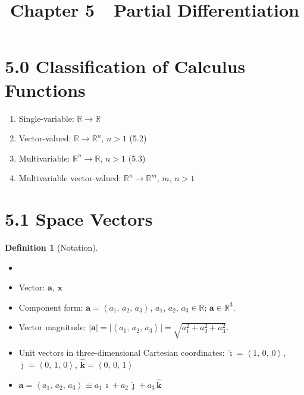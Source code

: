 \documentclass[12pt]{extarticle}
\newcommand{\llt}{\left\langle}
\newcommand{\rgt}{\right\rangle}
\theoremstyle{definition}
\newtheorem*{dfn}{Definition}
\newcommand{\va}{\mathbf{a}}
\newcommand{\vx}{\mathbf{x}}
\newcommand{\hi}{\widehat{\pmb{\imath}}}
\newcommand{\hj}{\widehat{\pmb{\jmath}}}
\newcommand{\hk}{\widehat{\mathbf{k}}}
\begin{document}
\title{\texorpdfstring{\vspace{-16mm} Chapter 5\ \ Partial Differentiation}{Chapter 5\ \ Partial Differentiation}} 
\author{\vspace{-5em}}
\date{\vspace{-5em}}
\maketitle
\thispagestyle{firststyle}

\section*{5.0 Classification of Calculus Functions}
\setlength{\columnsep}{-10mm}
\begin{multicols}{2}
  \begin{enumerate}\setlength{\itemsep}{0pt}
    \item Single-variable: $\mathbb{R}\to\mathbb{R}$
    \item Vector-valued: $\mathbb{R}\to\mathbb{R}^n$, $n > 1$ (5.2)
    \item Multivariable: $\mathbb{R}^n\to\mathbb{R}$, $n > 1$ (5.3)
    \item Multivariable vector-valued: $\mathbb{R}^n\to\mathbb{R}^m$, $m$, $n > 1$
  \end{enumerate}
\end{multicols}

\section*{5.1 Space Vectors}

\begin{dfn}[Notation]
  \begin{itemize}\setlength{\itemsep}{0pt}
    \item[]
    \item Vector: $\va$, $\vx$
    \item Component form: $\va = \llt a_1,\,a_2,\,a_3\rgt$, $a_1$, $a_2$, $a_3\in\mathbb{R}$; $\va\in\mathbb{R}^3$. 
    \item Vector magnitude: $|\va| = |\llt a_1,\,a_2,\,a_3 \rgt| = \sqrt{a_1^2 + a_2^2 + a_3^2}$. 
    \item Unit vectors in three-dimensional Cartesian coordinates: $\hi = \llt 1,\,0,\,0\rgt$, $\hj = \llt 0,\,1,\,0\rgt$, $\hk = \llt 0,\,0,\,1\rgt$
    \item $\va = \llt a_1,\,a_2,\,a_3\rgt \equiv a_1\,\hi + a_2\,\hj + a_3\,\hk$
  \end{itemize}
\end{dfn}
\end{document}
